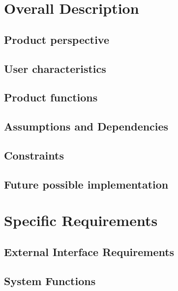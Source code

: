 \documentclass[12pt, a4paper]{article}
\begin{document}
	
\newpage
\section{Overall Description}

	\subsection{Product perspective}
	
	
	\subsection{User characteristics}
	
	
	\subsection{Product functions}
	
	
	\subsection{Assumptions and Dependencies}
	
	
	\subsection{Constraints}
	
		
	\subsection{Future possible implementation}
	
	
	
\newpage	    
\section{Specific Requirements}

	\subsection{External Interface Requirements}
	
	
	\subsection{System Functions}
	
	
\end{document}
